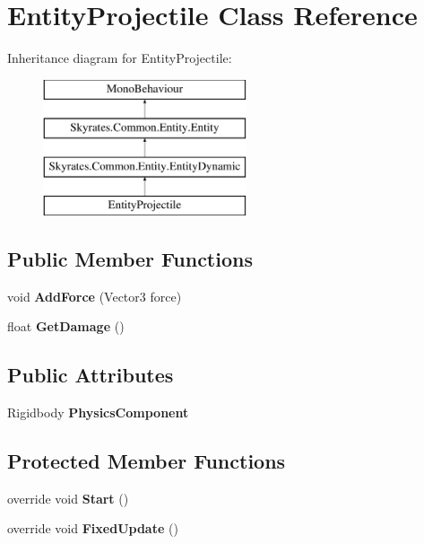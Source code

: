\hypertarget{class_entity_projectile}{\section{Entity\-Projectile Class Reference}
\label{class_entity_projectile}
}
Inheritance diagram for Entity\-Projectile\-:\begin{figure}[H]
\begin{center}
\leavevmode
\includegraphics[height=4.000000cm]{class_entity_projectile}
\end{center}
\end{figure}
\subsection*{Public Member Functions}
\begin{DoxyCompactItemize}
\item 
\hypertarget{class_entity_projectile_a028b344e40b3db9dd418110412dd81b7}{void {\bfseries Add\-Force} (Vector3 force)}\label{class_entity_projectile_a028b344e40b3db9dd418110412dd81b7}

\item 
\hypertarget{class_entity_projectile_ab800c5f6f125d81a48b7220629414a68}{float {\bfseries Get\-Damage} ()}\label{class_entity_projectile_ab800c5f6f125d81a48b7220629414a68}

\end{DoxyCompactItemize}
\subsection*{Public Attributes}
\begin{DoxyCompactItemize}
\item 
\hypertarget{class_entity_projectile_af5d50c3e4c16e3106fedd51f99e21d9a}{Rigidbody {\bfseries Physics\-Component}}\label{class_entity_projectile_af5d50c3e4c16e3106fedd51f99e21d9a}

\end{DoxyCompactItemize}
\subsection*{Protected Member Functions}
\begin{DoxyCompactItemize}
\item 
\hypertarget{class_entity_projectile_aeaa635535fb8be7c8fdc4eb10c6cf0cc}{override void {\bfseries Start} ()}\label{class_entity_projectile_aeaa635535fb8be7c8fdc4eb10c6cf0cc}

\item 
\hypertarget{class_entity_projectile_a7d20878e1e4491c79d3c4fba052783e3}{override void {\bfseries Fixed\-Update} ()}\label{class_entity_projectile_a7d20878e1e4491c79d3c4fba052783e3}

\end{DoxyCompactItemize}
